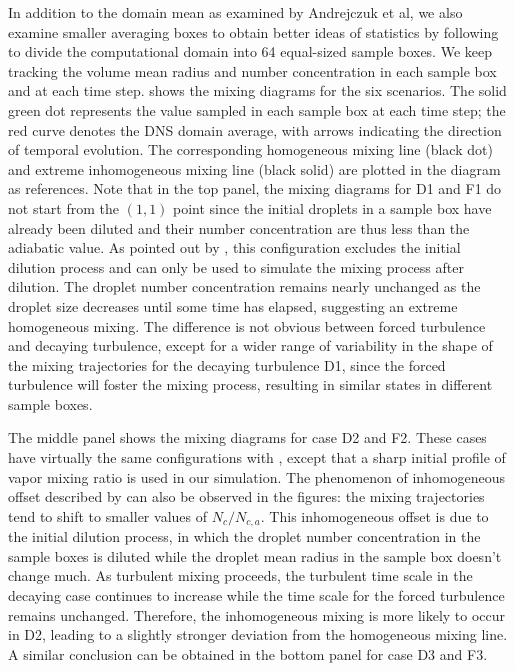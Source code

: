 \documentclass[draft,linenumbers]{AGUJournal}
\begin{document}
In addition to the domain mean as examined by Andrejczuk et al, we also examine smaller averaging boxes to obtain better ideas of statistics by following \citet{Kumar14} to divide the computational domain into 64 equal-sized sample boxes. We keep tracking the volume mean radius and number concentration in each sample box and at each time step.  shows the mixing diagrams for the six scenarios. The solid green dot represents the value sampled in each sample box at each time step; the red curve denotes the DNS domain average, with arrows indicating the direction of temporal evolution. The corresponding homogeneous mixing line (black dot) and extreme inhomogeneous mixing line (black solid) are plotted in the diagram as references. Note that in the top panel, the mixing diagrams for D1 and F1 do not start from the $(1,1)$ point since the initial droplets in a sample box have already been diluted and their number concentration are thus less than the adiabatic value. As pointed out by \citet{And04}, this configuration excludes the initial dilution process and can only be used to simulate the mixing process after dilution. The droplet number concentration remains nearly unchanged as the droplet size decreases until some time has elapsed, suggesting an extreme homogeneous mixing. The difference is not obvious between forced turbulence and decaying turbulence, except for a wider range of variability in the shape of the mixing trajectories for the decaying turbulence D1, since the forced turbulence will foster the mixing process, resulting in similar states in different sample boxes. 

The middle panel shows the mixing diagrams for case D2 and F2. These cases have virtually the same configurations with \citet{Kumar14}, except that a sharp initial profile of vapor mixing ratio is used in our simulation. The phenomenon of inhomogeneous offset described by \citet{Kumar14} can also be observed in the figures: the mixing trajectories tend to shift to smaller values of $N_c/N_{c,a}$. This inhomogeneous offset is due to the initial dilution process, in which the droplet number concentration in the sample boxes is diluted while the droplet mean radius in the sample box doesn't change much. As turbulent mixing proceeds, the turbulent time scale in the decaying case continues to increase while the time scale for the forced turbulence remains unchanged. Therefore, the inhomogeneous mixing is more likely to occur in D2, leading to a slightly stronger deviation from the homogeneous mixing line.  A similar conclusion can be obtained in the bottom panel for case D3 and F3. 
\end{document}

